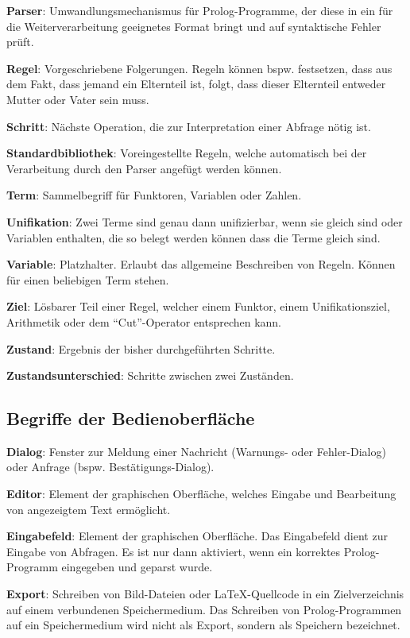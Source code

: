 \documentclass[parskip=full,11pt,twoside]{scrartcl}
\begin{document}
\textbf{Parser}:
Umwandlungsmechanismus für Prolog-Programme, der diese in ein für die Weiterverarbeitung geeignetes Format bringt und auf syntaktische Fehler prüft.

\textbf{Regel}:
Vorgeschriebene Folgerungen. Regeln können bspw. festsetzen, dass aus dem Fakt, dass jemand ein Elternteil ist, folgt, dass dieser Elternteil entweder Mutter oder Vater sein muss.

\textbf{Schritt}:
Nächste Operation, die zur Interpretation einer Abfrage nötig ist.

\textbf{Standardbibliothek}:
Voreingestellte Regeln, welche automatisch bei der Verarbeitung durch den Parser angefügt werden können.

\textbf{Term}:
Sammelbegriff für Funktoren, Variablen oder Zahlen.

\textbf{Unifikation}:
Zwei Terme sind genau dann unifizierbar, wenn sie gleich sind oder Variablen enthalten, die so belegt werden können dass die Terme gleich sind.

\textbf{Variable}:
Platzhalter. Erlaubt das allgemeine Beschreiben von Regeln. Können für einen beliebigen Term stehen.

\textbf{Ziel}:
Lösbarer Teil einer Regel, welcher einem Funktor, einem Unifikationsziel, Arithmetik oder dem \enquote{Cut}-Operator entsprechen kann.

\textbf{Zustand}:
Ergebnis der bisher durchgeführten Schritte.

\textbf{Zustandsunterschied}:
Schritte zwischen zwei Zuständen.

\subsection{Begriffe der Bedienoberfläche}
\textbf{Dialog}:
Fenster zur Meldung einer Nachricht (Warnungs- oder Fehler-Dialog) oder Anfrage (bspw. Bestätigungs-Dialog).

\textbf{Editor}:
Element der graphischen Oberfläche, welches Eingabe und Bearbeitung von angezeigtem Text ermöglicht.

\textbf{Eingabefeld}:
Element der graphischen Oberfläche. Das Eingabefeld dient zur Eingabe von Abfragen. Es ist nur dann aktiviert, wenn ein korrektes Prolog-Programm eingegeben und geparst wurde.

\textbf{Export}:
Schreiben von Bild-Dateien oder LaTeX-Quellcode in ein Zielverzeichnis auf einem verbundenen Speichermedium. Das Schreiben von Prolog-Programmen auf ein Speichermedium wird nicht als Export, sondern als Speichern bezeichnet.
\end{document}
